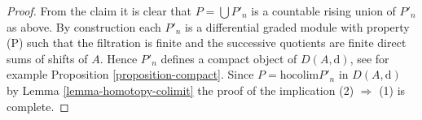 \documentclass{stacks-project}
\theoremstyle{plain}
\theoremstyle{definition}
\theoremstyle{remark}
\numberwithin{equation}{subsection}
\begin{document}
\begin{proof}
\medskip\noindent
From the claim it is clear that $P = \bigcup P'_n$
is a countable rising union of $P'_n$ as above.
By construction each $P'_n$ is a differential graded module with
property (P) such that the filtration is finite and the successive
quotients are finite direct sums of shifts of $A$. Hence $P'_n$
defines a compact object of $D(A, \text{d})$, see for example
Proposition \ref{proposition-compact}. Since
$P = \text{hocolim} P'_n$ in $D(A, \text{d})$
by Lemma \ref{lemma-homotopy-colimit}
the proof of the implication (2) $\Rightarrow$ (1) is complete.
\end{proof}








\end{document}
